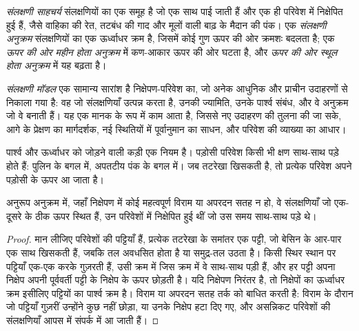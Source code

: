 \begin{definition}[संलक्षणी साहचर्य और संलक्षणी अनुक्रम]\label{def:b3:facies-models:association}
\emph{संलक्षणी साहचर्य} संलक्षणियों का एक समूह है
जो एक साथ पाई जाती हैं और एक ही परिवेश में निक्षेपित हुई हैं, जैसे वाहिका की रेत,
तटबंध की गाद और मूलों वाली बाढ़ के मैदान की पंक। एक \emph{संलक्षणी
अनुक्रम} संलक्षणियों का एक ऊर्ध्वाधर क्रम है, जिसमें कोई गुण
ऊपर की ओर क्रमशः बदलता है; एक \emph{ऊपर की ओर महीन होता
अनुक्रम} में कण-आकार ऊपर की ओर घटता है,
और \emph{ऊपर की ओर स्थूल होता अनुक्रम}
में यह बढ़ता है।
\end{definition}

\begin{definition}[संलक्षणी मॉडल]\label{def:b3:facies-models:model}
\emph{संलक्षणी मॉडल} एक सामान्य सारांश है
निक्षेपण-परिवेश का, जो अनेक आधुनिक और प्राचीन उदाहरणों से निकाला गया है:
वह जो संलक्षणियाँ उत्पन्न करता है, उनकी ज्यामिति, उनके पार्श्व संबंध,
और वे अनुक्रम जो वे बनाती हैं। यह एक मानक के रूप में काम आता है, जिससे नए उदाहरण की तुलना की जा सके,
आगे के प्रेक्षण का मार्गदर्शक, नई स्थितियों में पूर्वानुमान का साधन,
और परिवेश की व्याख्या का आधार।
\end{definition}

पार्श्व और ऊर्ध्वाधर को जोड़ने वाली कड़ी एक नियम है। पड़ोसी
परिवेश किसी भी क्षण साथ-साथ पड़े होते हैं: पुलिन  के बगल में,
 अपतटीय पंक के बगल में। जब तटरेखा खिसकती है,
तो प्रत्येक परिवेश अपने पड़ोसी के ऊपर आ जाता है।

\begin{theorem}[वाल्थर का नियम]\label{thm:b3:facies-models:walther}
अनुरूप अनुक्रम में, जहाँ निक्षेपण में कोई महत्वपूर्ण विराम या
अपरदन सतह न हो, वे संलक्षणियाँ जो एक-दूसरे के ठीक ऊपर स्थित हैं,
उन परिवेशों में निक्षेपित हुई थीं जो उस समय साथ-साथ पड़े थे।
\end{theorem}

\begin{proof}
मान लीजिए परिवेशों की पट्टियाँ हैं, प्रत्येक तटरेखा के समांतर एक पट्टी, जो
बेसिन के आर-पार एक साथ खिसकती हैं, जबकि तल अवधसित होता है या समुद्र-तल
उठता है। किसी स्थिर स्थान पर पट्टियाँ एक-एक करके गुज़रती हैं, उसी क्रम में
जिस क्रम में वे साथ-साथ पड़ी हैं, और हर पट्टी अपना निक्षेप
अपनी पूर्ववर्ती पट्टी के निक्षेप के ऊपर छोड़ती है। यदि निक्षेपण निरंतर है, तो
निक्षेपों का ऊर्ध्वाधर क्रम इसीलिए पट्टियों का पार्श्व क्रम है।
विराम या अपरदन सतह तर्क को बाधित करती है: विराम के दौरान जो पट्टियाँ गुज़रीं
उन्होंने कुछ नहीं छोड़ा, या उनके निक्षेप हटा दिए गए, और असन्निकट परिवेशों की
संलक्षणियाँ आपस में संपर्क में आ जाती हैं।
\end{proof}


